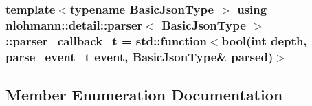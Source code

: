 \subsubsection[{\texorpdfstring{parser\+\_\+callback\+\_\+t}{parser_callback_t}}]{\setlength{\rightskip}{0pt plus 5cm}template$<$typename Basic\+Json\+Type $>$ using {\bf nlohmann\+::detail\+::parser}$<$ Basic\+Json\+Type $>$\+::{\bf parser\+\_\+callback\+\_\+t} =  std\+::function$<$bool(int depth, {\bf parse\+\_\+event\+\_\+t} event, Basic\+Json\+Type\& parsed)$>$}\hypertarget{classnlohmann_1_1detail_1_1parser_ad250ad4f2b4af4a497e727c963162ff1}{}\label{classnlohmann_1_1detail_1_1parser_ad250ad4f2b4af4a497e727c963162ff1}


\subsection{Member Enumeration Documentation}
